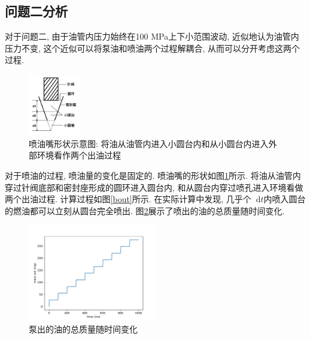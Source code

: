 \documentclass{cumcmthesis}
\renewcommand\d{\mathop{}\!\mathrm{d}}
\begin{document}
\subsection{问题二分析}
对于问题二, 由于油管内压力始终在100 MPa上下小范围波动, 近似地认为油管内压力不变, 这个近似可以将泵油和喷油两个过程解耦合, 从而可以分开考虑这两个过程. 

\begin{figure}[htbp]
    \centering
    \includegraphics[width=0.2\textwidth]{penzui.jpg} 
    \caption{喷油嘴形状示意图: 将油从油管内进入小圆台内和从小圆台内进入外部环境看作两个出油过程}
    \label{penzui}
\end{figure}

对于喷油的过程, 喷油量的变化是固定的. 喷油嘴的形状如图\ref{penzui}所示. 将油从油管内穿过针阀底部和密封座形成的圆环进入圆台内, 和从圆台内穿过喷孔进入环境看做两个出油过程. 计算过程如图\ref{bout}所示. 在实际计算中发现, 几乎个$\d t$内喷入圆台的燃油都可以立刻从圆台完全喷出. 图\ref{bout2}展示了喷出的油的总质量随时间变化. 

\begin{figure}[htbp]
    \centering
    \includegraphics[width=0.5\textwidth]{bout2.pdf} 
    \caption{泵出的油的总质量随时间变化}
    \label{bout2}
\end{figure}
\end{document}
